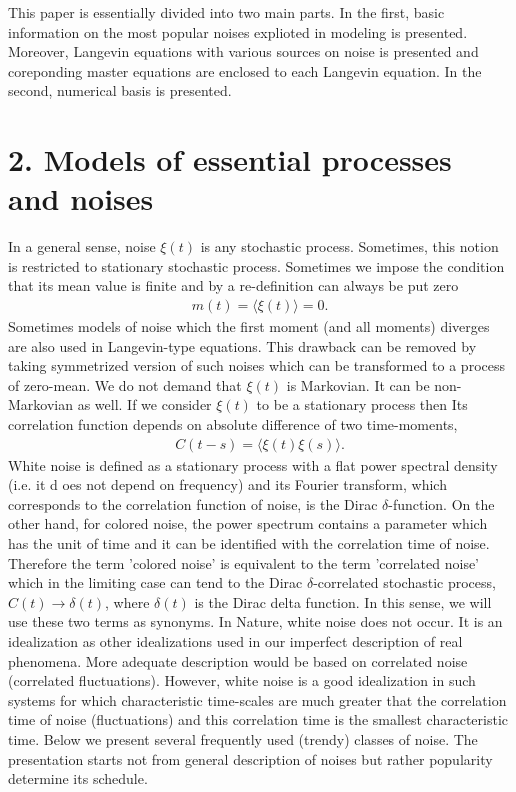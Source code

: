 \documentclass[authoryear,draft,1p,times]{elsarticle}
\renewcommand{\=}{\stackrel{\mathrm{d}}{=}}
\begin{document}
    This paper is essentially divided into two main parts. In the first, basic information on the most popular noises explioted in  modeling is  presented.  Moreover, Langevin equations with various sources on noise is presented and coreponding master equations are enclosed to each Langevin equation.  In the second, numerical basis is presented. 



\section*{2. Models of essential processes and noises} 

In a general sense, noise $\xi(t)$ is any stochastic process. 
Sometimes, this notion is restricted to   stationary 
stochastic process.  Sometimes we impose the condition  that its mean value is  finite and 
 by  a re-definition  can always be put zero
%
\begin{eqnarray}
\label{avnoise}
m(t) = \langle \xi(t)\rangle = 0. 
\end{eqnarray} 
%
Sometimes models of  noise which the first moment (and all moments) diverges are also used in Langevin-type equations. This drawback can be removed by taking symmetrized version of such noises which can be transformed to a process of   zero-mean.  
We do not demand that $\xi(t)$ is Markovian. It can be non-Markovian as well.
If we consider $\xi(t)$ to be a stationary process then Its correlation function depends on absolute difference of two time-moments, 
%
\begin{eqnarray}
\label{correl}
C(t-s)=   \langle \xi(t) \xi(s) \rangle. 
\end{eqnarray} 
%
White noise is defined  as a stationary process with a flat power spectral density (i.e. it d oes not depend on frequency)  and 
its Fourier transform, which  corresponds to the correlation function 
of noise, is the Dirac $\delta$-function. 
On the other hand, for colored noise, the power spectrum contains 
 a parameter 
which has the unit of time and it can be identified with the correlation time 
of noise.  
Therefore  the term 'colored noise' 
is equivalent to the  term 'correlated noise' which 
in the limiting case can tend to the Dirac $\delta$-correlated 
stochastic process, $C(t) \to \delta (t)$, where $\delta (t)$ is the 
Dirac delta function.  In this 
sense, we will use these two terms as synonyms.  In Nature, white 
noise does not 
occur. It is  an idealization as  other idealizations used in 
our imperfect description of real phenomena. 
More adequate description would be based on correlated noise 
(correlated fluctuations).  
However, white noise is a good idealization in such systems 
for which characteristic 
time-scales are much greater that the correlation time of noise 
(fluctuations) and this correlation time is the smallest 
characteristic time.   
Below we present several  frequently used (trendy) classes of noise. 
The presentation starts not from general description of   noises but rather 
popularity  determine its schedule.  
\end{document}
